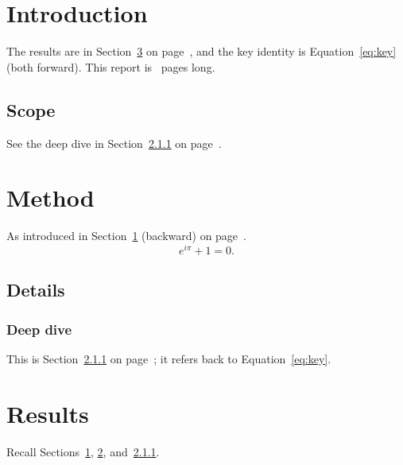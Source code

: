 \documentclass{article}
\begin{document}
\section{Introduction}\label{sec:intro}
The results are in Section~\ref{sec:results} on page~\pageref{sec:results},
and the key identity is Equation~\ref{eq:key} (both forward).
This report is \lastpage\ pages long.
\lipsum[1-2]

\subsection{Scope}\label{sub:scope}
See the deep dive in Section~\ref{ssub:deep} on page~\pageref{ssub:deep}.
\lipsum[1-2]

\section{Method}\label{sec:method}
As introduced in Section~\ref{sec:intro} (backward) on
page~\pageref{sec:intro}.
\begin{equation}\label{eq:key}
  e^{i\pi} + 1 = 0 .
\end{equation}
\lipsum[1-3]

\subsection{Details}\label{sub:details}
\lipsum[1]

\subsubsection{Deep dive}\label{ssub:deep}
This is Section~\ref{ssub:deep} on page~\pageref{ssub:deep};
it refers back to Equation~\ref{eq:key}.
\lipsum[1-2]

\section{Results}\label{sec:results}
Recall Sections~\ref{sec:intro}, \ref{sec:method}, and~\ref{ssub:deep}.
\lipsum[1]
\end{document}
